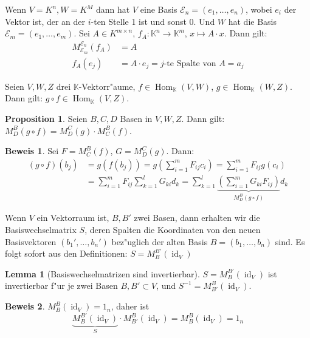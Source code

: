 \documentclass[oneside,fontsize=11pt,paper=a4,BCOR=0mm,DIV=12,automark,headsepline]{scrbook}
\DeclareMathOperator{\mHom}{Hom}
\DeclareMathOperator{\mId}{id}
\theoremstyle{remark}
\theoremstyle{definition}
\newtheorem*{proposition}{Proposition}
\newtheorem{lemma}{Lemma}[section]
\theoremstyle{definition}
\newtheorem*{prof}{Beweis}
\theoremstyle{remark}
\begin{document}
\begin{exa}
  Wenn \(V=K^n, W=K^M\) dann hat \(V\) eine Basis \(\mathcal{E}_n = (e_1, \dots, e_n)\), wobei \(e_i\) der Vektor ist, der an der \(i\)-ten Stelle 1 ist und sonst 0. Und \(W\) hat die Basis \(\mathcal{E}_m = (e_1, \dots, e_m)\).
  Sei \(A\in K^{m\times n }\), \(f_A: \mathbb{K}^n\to \mathbb{K}^m\), \(x \mapsto A\cdot x\). Dann gilt:
  \begin{align*}
    M^{\mathcal{E}_n}_{\mathcal{E}_m}(f_A) &= A\\
    f_A(e_j) &= A\cdot e_j = j\text{-te Spalte von } A = a_j
  \end{align*}
\end{exa}

Seien \(V, W, Z\) drei \(\mathbb{K}\)-Vektorr"aume, \(f \in \mHom_\mathbb{K}(V, W)\), \(g \in \mHom_\mathbb{K}(W,Z)\). Dann gilt: \(g\circ f \in \mHom_\mathbb{K}(V,Z)\).

\begin{proposition}
  Seien \(B,C,D\) Basen in
  \(V,W,Z\). Dann gilt: \(M^B_D(g\circ f) = M^C_D(g)\cdot M^B_C(f)\).
\end{proposition}
\begin{prof}
  Sei \(F = M^B_C(f)\), \(G = M^C_D(g)\). Dann:
  \begin{align*}
    (g\circ f)(b_j) &= g(f(b_j)) = g\left(\sum_{i=1}^m F_{ij}c_i\right) = \sum_{i=1}^mF_{ij}g(c_i) \\&= \sum_{i=1}^m F_{ij}\sum_{k=1}^lG_{ki}d_k = \sum_{k=1}^l\underbrace{\left(\sum_{i=1}^mG_{ki}F_{ij}\right)}_{M^B_D(g\circ f)}d_k
  \end{align*}
\end{prof}

Wenn \(V\) ein Vektorraum ist, \(B,B'\) zwei Basen, dann erhalten wir die
Basiswechselmatrix \(S\), deren Spalten die Koordinaten von den neuen
Basisvektoren \((b_1', \dots, b_n')\) bez"uglich der alten Basis \(B = (b_1,
\dots, b_n)\) sind. Es folgt sofort aus den Definitionen:
\(S=M^{B'}_B(\mId_V)\)

\begin{lemma}[Basiswechselmatrizen sind invertierbar]
  \(S = M^{B'}_B(\mId_V)\) ist invertierbar f"ur je zwei Basen \(B, B' \subset V\), und \(S^{-1} = M^B_{B'}(\mId_V)\).
\end{lemma}
\begin{prof}
  \(M^B_B(\mId_V)=1_n\), daher ist
  \[\underbrace{M^{B'}_B(\mId_V)}_{S}\cdot M^B_{B'}(\mId_V) = M^B_B(\mId_V) = 1_n \]
\end{prof}
\end{document}
